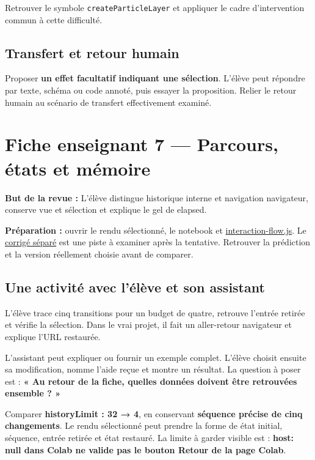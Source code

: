 \documentclass[
  canadien,
  11pt,
  a4paper,
]{report}
\begin{document}
Retrouver le symbole \texttt{create\allowbreak{}Particle\allowbreak{}Layer} et appliquer le cadre
d'intervention commun à cette difficulté.

\section{Transfert et retour humain}\label{transfert-et-retour-humain-5}

Proposer \textbf{un effet facultatif indiquant une sélection}. L'élève
peut répondre par texte, schéma ou code annoté, puis essayer la
proposition. Relier le retour humain au scénario de transfert
effectivement examiné.

\chapter{Fiche enseignant 7 --- Parcours, états et
mémoire}\label{fiche-enseignant-7-parcours-uxe9tats-et-muxe9moire}

\textbf{But de la revue :} L'élève distingue historique interne et
navigation navigateur, conserve vue et sélection et explique le gel de
elapsed.

\textbf{Préparation :} ouvrir le rendu sélectionné, le notebook et
\href{../../frontend/module-7/interaction-flow.js}{interaction-flow.js}.
Le \href{../../notebooks/instructor/module-7.ipynb}{corrigé séparé} est
une piste à examiner après la tentative. Retrouver la prédiction et la
version réellement choisie avant de comparer.

\section{Une activité avec l'élève et son
assistant}\label{une-activituxe9-avec-luxe9luxe8ve-et-son-assistant-6}

L'élève trace cinq transitions pour un budget de quatre, retrouve
l'entrée retirée et vérifie la sélection. Dans le vrai projet, il fait
un aller-retour navigateur et explique l'URL restaurée.

L'assistant peut expliquer ou fournir un exemple complet. L'élève
choisit ensuite sa modification, nomme l'aide reçue et montre un
résultat. La question à poser est : \textbf{« Au retour de la fiche,
quelles données doivent être retrouvées ensemble ? »}

Comparer \textbf{historyLimit : 32 → 4}, en conservant \textbf{séquence
précise de cinq changements}. Le rendu sélectionné peut prendre la forme
de état initial, séquence, entrée retirée et état restauré. La limite à
garder visible est : \textbf{host: null dans Colab ne valide pas le
bouton Retour de la page Colab}.
\end{document}
